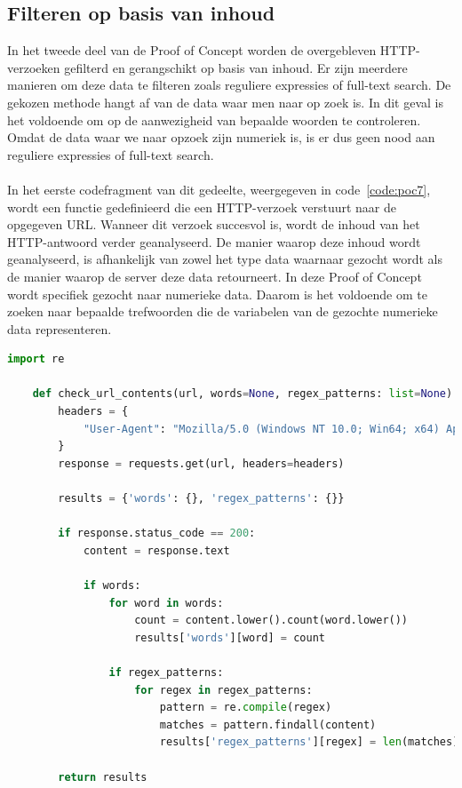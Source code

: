\subsection{Filteren op basis van inhoud}
In het tweede deel van de Proof of Concept worden de overgebleven HTTP-verzoeken gefilterd en gerangschikt op basis van inhoud. Er zijn meerdere manieren om deze data te filteren zoals reguliere expressies of full-text search. De gekozen methode hangt af van de data waar men naar op zoek is. In dit geval is het voldoende om op de aanwezigheid van bepaalde woorden te controleren. Omdat de data waar we naar opzoek zijn numeriek is, is er dus geen nood aan reguliere expressies of full-text search.
\\ \\
In het eerste codefragment van dit gedeelte, weergegeven in code~\ref{code:poc7}, wordt een functie gedefinieerd die een HTTP-verzoek verstuurt naar de opgegeven URL. Wanneer dit verzoek succesvol is, wordt de inhoud van het HTTP-antwoord verder geanalyseerd. De manier waarop deze inhoud wordt geanalyseerd, is afhankelijk van zowel het type data waarnaar gezocht wordt als de manier waarop de server deze data retourneert. In deze Proof of Concept wordt specifiek gezocht naar numerieke data. Daarom is het voldoende om te zoeken naar bepaalde trefwoorden die de variabelen van de gezochte numerieke data representeren.

\begin{lstlisting}[language=python, captionpos=b, caption={Filteren van performance-logs }, label={code:poc7}]
    import re

    def check_url_contents(url, words=None, regex_patterns: list=None):
        headers = {
            "User-Agent": "Mozilla/5.0 (Windows NT 10.0; Win64; x64) AppleWebKit/537.36 (KHTML, like Gecko) Chrome/58.0.3029.110 Safari/537.3"
        }
        response = requests.get(url, headers=headers)

        results = {'words': {}, 'regex_patterns': {}}

        if response.status_code == 200:
            content = response.text

            if words:
                for word in words:
                    count = content.lower().count(word.lower())
                    results['words'][word] = count

                if regex_patterns:
                    for regex in regex_patterns:
                        pattern = re.compile(regex)
                        matches = pattern.findall(content)
                        results['regex_patterns'][regex] = len(matches)

        return results
\end{lstlisting}

